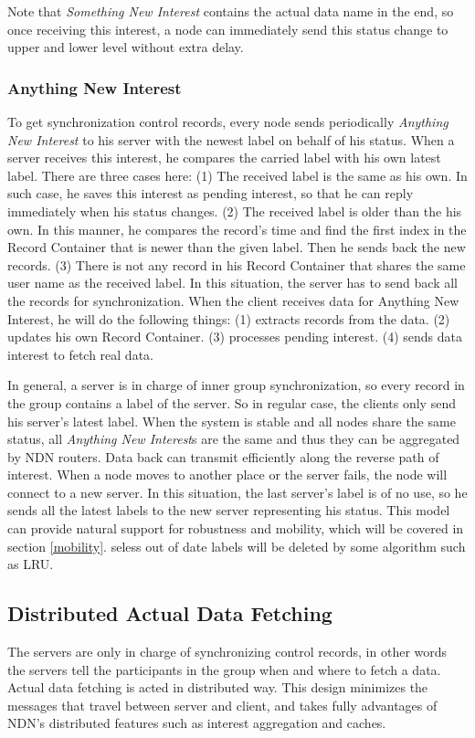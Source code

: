 \documentclass[conference]{IEEEtran}
\begin{document}
Note that \emph{Something New Interest} contains the actual data name in the end,
so once receiving this interest,
a node can immediately send this status change to upper and lower level without extra delay.

\subsubsection{Anything New Interest}
To get synchronization control records,
every node sends periodically \emph{Anything New Interest} to his server with the newest label on behalf of his status.
When a server receives this interest,
he compares the carried label with his own latest label. There are three cases here:
(1) The received label is the same as his own.
In such case, he saves this interest as pending interest,
so that he can reply immediately when his status changes.
(2) The received label is older than the his own.
In this manner, he compares the record's time and find the first index
in the Record Container that is newer than the given label.
Then he sends back the new records.
(3) There is not any record in his Record Container
that shares the same user name as the received label.
In this situation, the server has to send back all the records for synchronization.
When the client receives data for Anything New Interest, he will do the following things:
(1) extracts records from the data.
(2) updates his own Record Container.
(3) processes pending interest.
(4) sends data interest to fetch real data.

In general, a server is in charge of inner group synchronization,
so every record in the group contains a label of the server.
So in regular case, the clients only send his server's latest label.
When the system is stable and all nodes share the same status,
all \emph{Anything New Interest}s are the same and thus they can be aggregated by NDN routers.
Data back can transmit efficiently along the reverse path of interest.
When a node moves to another place or the server fails, the node will connect to a new server.
In this situation, the last server's label is of no use,
so he sends all the latest labels to the new server representing his status.
This model can provide natural support for robustness and mobility,
which will be covered in section \ref{mobility}.
seless out of date labels will be deleted by some algorithm such as LRU.

\subsection{Distributed Actual Data Fetching}
The servers are only in charge of synchronizing control records,
in other words the servers tell the participants in the group when and where to fetch a data.
Actual data fetching is acted in distributed way.
This design minimizes the messages that travel between server and client,
and takes fully advantages of NDN's distributed features such as interest aggregation and caches.
\end{document}
